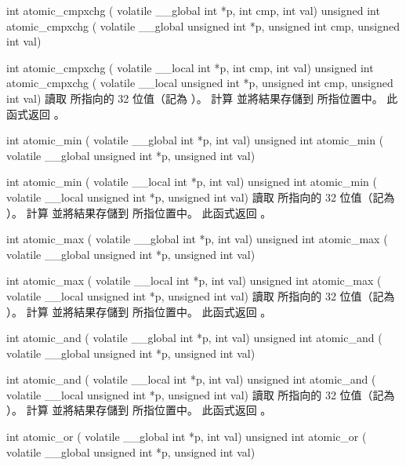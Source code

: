 int atomic_cmpxchg (
	volatile __global int *p,
	int cmp, int val)
unsigned int atomic_cmpxchg (
	volatile __global unsigned int *p,
	unsigned int cmp,
	unsigned int val)

int atomic_cmpxchg (
	volatile __local int *p,
	int cmp,
	int val)
unsigned int atomic_cmpxchg (
	volatile __local unsigned int *p,
	unsigned int cmp,
	unsigned int val)
\stopbuffer
{}
讀取  所指向的 32 位值（記為 ）。
計算  並將結果存儲到  所指位置中。
此函式返回 。
\stopbuffer

int atomic_min (
	volatile __global int *p,
	int val)
unsigned int atomic_min (
	volatile __global unsigned int *p,
	unsigned int val)

int atomic_min (
	volatile __local int *p,
	int val)
unsigned int atomic_min (
	volatile __local unsigned int *p,
	unsigned int val)
\stopbuffer
{}
讀取  所指向的 32 位值（記為 ）。
計算  並將結果存儲到  所指位置中。
此函式返回 。
\stopbuffer

int atomic_max (
	volatile __global int *p,
	int val)
unsigned int atomic_max (
	volatile __global unsigned int *p,
	unsigned int val)

int atomic_max (
	volatile __local int *p,
	int val)
unsigned int atomic_max (
	volatile __local unsigned int *p,
	unsigned int val)
\stopbuffer
{}
讀取  所指向的 32 位值（記為 ）。
計算  並將結果存儲到  所指位置中。
此函式返回 。
\stopbuffer

int atomic_and (
	volatile __global int *p,
	int val)
unsigned int atomic_and (
	volatile __global unsigned int *p,
	unsigned int val)

int atomic_and (
	volatile __local int *p,
	int val)
unsigned int atomic_and (
	volatile __local unsigned int *p,
	unsigned int val)
\stopbuffer
{}
讀取  所指向的 32 位值（記為 ）。
計算  並將結果存儲到  所指位置中。
此函式返回 。
\stopbuffer

int atomic_or (
	volatile __global int *p,
	int val)
unsigned int atomic_or (
	volatile __global unsigned int *p,
	unsigned int val)

